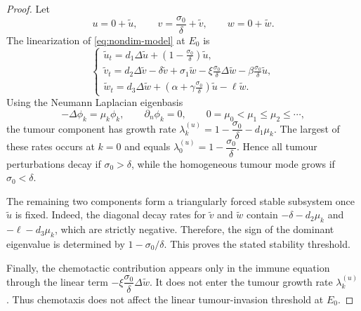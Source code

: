 \documentclass[a4paper,fleqn,longmktitle]{cas-sc}
\theoremstyle{plain}
\theoremstyle{definition}
\numberwithin{equation}{section}
\begin{document}
\begin{proof}
Let
\[
u=0+\widetilde u,\qquad
v=\frac{\sigma_0}{\delta}+\widetilde v,\qquad
w=0+\widetilde w.
\]
The linearization of \eqref{eq:nondim-model} at $E_0$ is
\begin{equation}\label{eq:tumour-free-linearization}
\begin{cases}
\widetilde u_t=
d_1\Delta \widetilde u+
\left(1-\frac{\sigma_0}{\delta}\right)\widetilde u,\\[2pt]
\widetilde v_t=
d_2\Delta \widetilde v-\delta\widetilde v
+\sigma_1\widetilde w
-\xi\frac{\sigma_0}{\delta}\Delta\widetilde w
-\beta\frac{\sigma_0}{\delta}\widetilde u,\\[2pt]
\widetilde w_t=
d_3\Delta \widetilde w+
\left(\alpha+\gamma\frac{\sigma_0}{\delta}\right)\widetilde u
-\ell\widetilde w .
\end{cases}
\end{equation}
Using the Neumann Laplacian eigenbasis
\[
-\Delta\phi_k=\mu_k\phi_k,\qquad
\partial_n\phi_k=0,
\qquad
0=\mu_0<\mu_1\le\mu_2\le\cdots,
\]
the tumour component has growth rate
$\lambda_k^{(u)}
=
1-\dfrac{\sigma_0}{\delta}-d_1\mu_k$.
The largest of these rates occurs at $k=0$ and equals
$\lambda_0^{(u)}=1-\dfrac{\sigma_0}{\delta}$.
Hence all tumour perturbations decay if $\sigma_0>\delta$, while the homogeneous
tumour mode grows if $\sigma_0<\delta$.

The remaining two components form a triangularly forced stable subsystem once
$\widetilde u$ is fixed. Indeed, the diagonal decay rates for
$\widetilde v$ and $\widetilde w$ contain $-\delta-d_2\mu_k$ and
$-\ell-d_3\mu_k$, which are strictly negative. Therefore, the sign of the
dominant eigenvalue is determined by
$1-\sigma_0/\delta$. This proves the stated stability threshold.

Finally, the chemotactic contribution appears only in the immune equation
through the linear term
$-\xi\dfrac{\sigma_0}{\delta}\Delta\widetilde w$.
It does not enter the tumour growth rate
$\lambda_k^{(u)}$. Thus chemotaxis does not affect the linear
tumour-invasion threshold at $E_0$.
\end{proof}
\end{document}
